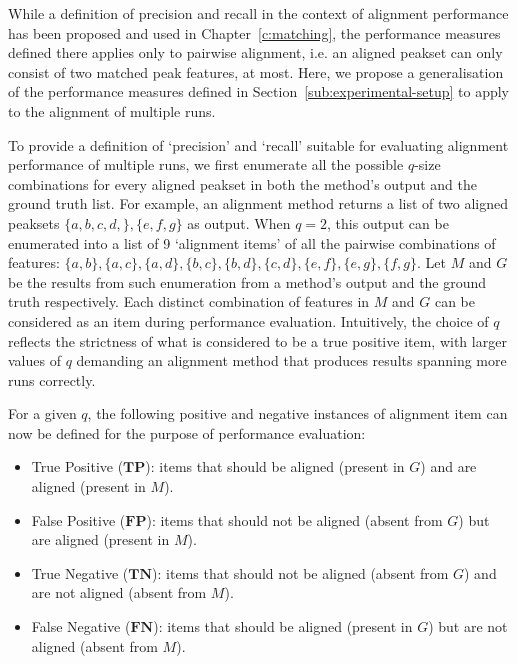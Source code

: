While a definition of precision and recall in the context of alignment performance has been proposed and used in Chapter~\ref{c:matching}, the performance measures defined there applies only to pairwise alignment, i.e. an aligned peakset can only consist of two matched peak features, at most. Here, we propose a generalisation of the performance measures defined in Section~\ref{sub:experimental-setup} to apply to the alignment of multiple runs.

To provide a definition of `precision' and `recall' suitable for evaluating alignment performance of multiple runs, we first enumerate all the possible $q$-size combinations for every aligned peakset in both the method's output and the ground truth list. For example, an alignment method returns a list of two aligned peaksets $\{a,b,c,d,\},\allowbreak\{e,f,g\}$ as output. When $q=2$, this output can be enumerated into a list of 9 `alignment items' of all the pairwise combinations of features: $\{a,b\},\allowbreak\{a,c\},\allowbreak\{a,d\},\allowbreak\{b,c\},\allowbreak\{b,d\},\allowbreak\{c,d\},\allowbreak\{e,f\},\allowbreak\{e,g\},\allowbreak\{f,g\}$. Let $M$ and $G$ be the results from such enumeration from a method's output and the ground truth respectively. Each distinct combination of features in $M$ and $G$ can be considered as an item during performance evaluation. Intuitively, the choice of $q$ reflects the strictness of what is considered to be a true positive item, with larger values of $q$ demanding an alignment method that produces results spanning more runs correctly. 

For a given $q$, the following positive and negative instances of alignment item can now be defined for the purpose of performance evaluation:

\begin{itemize}
\item True Positive ($\boldsymbol{TP}$): items that should be aligned (present in $G$) and are aligned (present in $M$).
\item False Positive ($\boldsymbol{FP}$): items that should not be aligned (absent from $G$) but are aligned (present in $M$).
\item True Negative ($\boldsymbol{TN}$): items that should not be aligned (absent from $G$) and are not aligned (absent from $M$).
\item False Negative ($\boldsymbol{FN}$): items that should be aligned (present in $G$) but are not aligned (absent from $M$).
\end{itemize}

